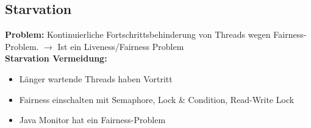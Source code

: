 \subsection{Starvation}
\textcolor{b}{\textbf{Problem:}} Kontinuierliche Fortschrittsbehinderung von Threads wegen Fairness-Problem. $\rightarrow$ Ist ein Liveness/Fairness Problem\\
\textcolor{b}{\textbf{Starvation Vermeidung:}}
\begin{itemize}[topsep=0pt, leftmargin=3mm]
    \setlength\itemsep{-0.3em}
    \item Länger wartende Threads haben Vortritt
    \item Fairness einschalten mit \textcolor{b}{Semaphore, Lock \& Condition, Read-Write Lock}
    \item Java Monitor hat ein Fairness-Problem
\end{itemize}